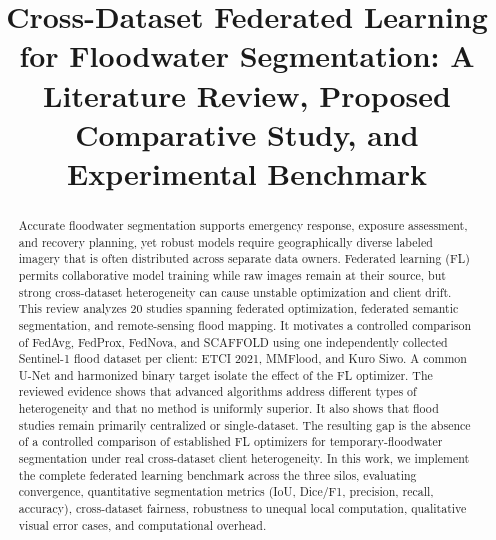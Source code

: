 \documentclass[conference]{IEEEtran}
\begin{document}
\title{Cross-Dataset Federated Learning for Floodwater Segmentation: A Literature Review, Proposed Comparative Study, and Experimental Benchmark}

\author{
\and
{}
\and
{}
}

\maketitle

\begin{abstract}
Accurate floodwater segmentation supports emergency response, exposure assessment, and recovery planning, yet robust models require geographically diverse labeled imagery that is often distributed across separate data owners. Federated learning (FL) permits collaborative model training while raw images remain at their source, but strong cross-dataset heterogeneity can cause unstable optimization and client drift. This review analyzes 20 studies spanning federated optimization, federated semantic segmentation, and remote-sensing flood mapping. It motivates a controlled comparison of FedAvg, FedProx, FedNova, and SCAFFOLD using one independently collected Sentinel-1 flood dataset per client: ETCI 2021, MMFlood, and Kuro Siwo. A common U-Net and harmonized binary target isolate the effect of the FL optimizer. The reviewed evidence shows that advanced algorithms address different types of heterogeneity and that no method is uniformly superior. It also shows that flood studies remain primarily centralized or single-dataset. The resulting gap is the absence of a controlled comparison of established FL optimizers for temporary-floodwater segmentation under real cross-dataset client heterogeneity. In this work, we implement the complete federated learning benchmark across the three silos, evaluating convergence, quantitative segmentation metrics (IoU, Dice/F1, precision, recall, accuracy), cross-dataset fairness, robustness to unequal local computation, qualitative visual error cases, and computational overhead.
\end{abstract}
\end{document}

